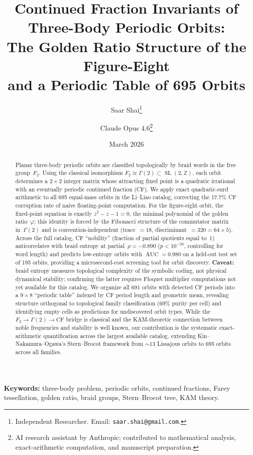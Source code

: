 \documentclass[11pt]{article}
\title{Continued Fraction Invariants of Three-Body Periodic Orbits:\\
The Golden Ratio Structure of the Figure-Eight\\
and a Periodic Table of 695 Orbits}
\author{
  Saar Shai\thanks{Independent Researcher. Email: \texttt{saar.shai@gmail.com}.}
  \and
  Claude Opus 4.6\thanks{AI research assistant by Anthropic; contributed to mathematical analysis, exact-arithmetic computation, and manuscript preparation.}
}
\date{March 2026}
\theoremstyle{definition}
\newcommand{\Z}{\mathbb{Z}}
\DeclareMathOperator{\SL}{SL}
\DeclareMathOperator{\AUC}{AUC}
\begin{document}
\maketitle

\begin{abstract}
Planar three-body periodic orbits are classified topologically by
braid words in the free group~$F_2$. Using the classical isomorphism
$F_2 \cong \Gamma(2) \subset \SL(2,\Z)$, each orbit determines a
$2 \times 2$ integer matrix whose attracting fixed point is a
quadratic irrational with an eventually periodic continued fraction
(CF). We apply exact quadratic-surd arithmetic to all 695
equal-mass orbits in the Li--Liao catalog, correcting the 17.7\%
CF corruption rate of naive floating-point computation. For the
figure-eight orbit, the fixed-point equation is exactly
$z^2 - z - 1 = 0$, the minimal polynomial of the golden
ratio~$\varphi$; this identity is forced by the Fibonacci structure
of the commutator matrix in~$\Gamma(2)$ and is
convention-independent (trace~$= 18$, discriminant~$= 320 = 64
\times 5$). Across the full catalog, CF ``nobility'' (fraction of
partial quotients equal to~$1$) anticorrelates with braid entropy
at partial~$\rho = -0.890$ ($p < 10^{-50}$, controlling for word
length) and predicts low-entropy orbits with $\AUC = 0.980$ on a
held-out test set of 195 orbits, providing a microsecond-cost
screening tool for orbit discovery.  \textbf{Caveat:} braid entropy
measures topological complexity of the symbolic coding, not physical
dynamical stability; confirming the latter requires Floquet
multiplier computations not yet available for this catalog. We organize all 691 orbits with detected CF
periods into a $9 \times 8$ ``periodic table'' indexed by CF
period length and geometric mean, revealing structure orthogonal to
topological family classification (69\% purity per cell) and
identifying empty cells as predictions for undiscovered orbit
types. While the $F_2 \to \Gamma(2) \to \text{CF}$ bridge is
classical and the KAM-theoretic connection between noble
frequencies and stability is well known, our contribution is the
systematic exact-arithmetic quantification across the largest
available catalog, extending Kin--Nakamura--Ogawa's
Stern--Brocot framework from ${\sim}\!13$ Lissajous orbits to
695 orbits across all families.
\end{abstract}

\medskip
\noindent\textbf{Keywords:} three-body problem, periodic orbits, continued fractions, Farey tessellation, golden ratio, braid groups, Stern--Brocot tree, KAM theory.
\end{document}
